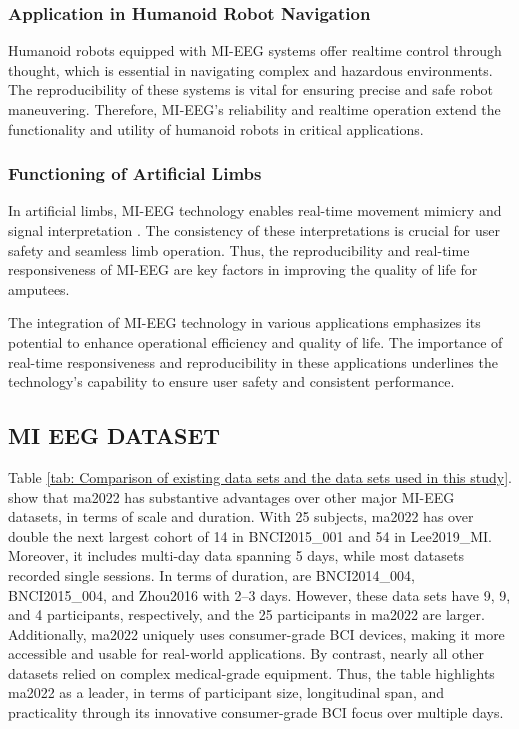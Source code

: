         \subsubsection*{Application in Humanoid Robot Navigation}
        \label{subsubsec:Application in Humanoid Robot Navigation}
        Humanoid robots equipped with MI-EEG systems offer realtime control through thought, which is essential in navigating complex and hazardous environments\cite{aljalal2019robot}. The reproducibility of these systems is vital for ensuring precise and safe robot maneuvering. Therefore, MI-EEG's reliability and realtime operation extend the functionality and utility of humanoid robots in critical applications.

        \subsubsection*{Functioning of Artificial Limbs}
        In artificial limbs, MI-EEG technology enables real-time movement mimicry and signal interpretation \cite{al2018eeg}. The consistency of these interpretations is crucial for user safety and seamless limb operation. Thus, the reproducibility and real-time responsiveness of MI-EEG are key factors in improving the quality of life for amputees.

    The integration of MI-EEG technology in various applications emphasizes its potential to enhance operational efficiency and quality of life. The importance of real-time responsiveness and reproducibility in these applications underlines the technology's capability to ensure user safety and consistent performance.
    \subsection{MI EEG DATASET}
    Table \ref{tab: Comparison of existing data sets and the data sets used in this study}. show that ma2022\cite{ma2022large} has substantive advantages over other major MI-EEG datasets, in terms of scale and duration. With 25 subjects, ma2022\cite{ma2022large} has over double the next largest cohort of 14 in BNCI2015\_001\cite{faller2012autocalibration} and 54 in Lee2019\_MI\cite{lee2019eeg}. Moreover, it includes multi-day data spanning 5 days, while most datasets recorded single sessions. In terms of duration, are BNCI2014\_004\cite{leeb2007brain}, BNCI2015\_004\cite{scherer2015individually}, and Zhou2016\cite{zhou2016fully} with 2--3 days. However, these data sets have 9, 9, and 4 participants, respectively, and the 25 participants in ma2022 are larger. Additionally, ma2022 uniquely uses consumer-grade BCI devices, making it more accessible and usable for real-world applications. By contrast, nearly all other datasets relied on complex medical-grade equipment. Thus, the table highlights ma2022 as a leader, in terms of participant size, longitudinal span, and practicality through its innovative consumer-grade BCI focus over multiple days.


